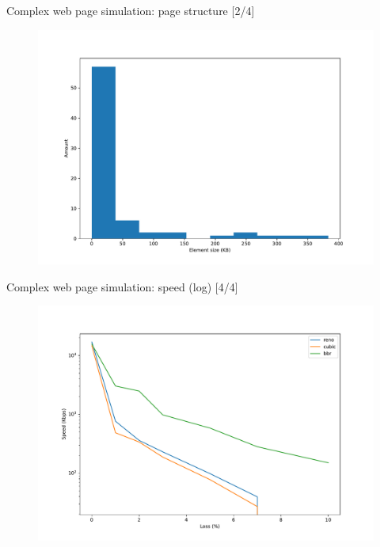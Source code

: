 \documentclass[13pt,aspectratio=43]{beamer}
\begin{document}
\begin{frame}{Complex web page simulation: page structure [2/4]}
  \begin{figure}
	  \includegraphics[width=\textwidth,height=\textheight,keepaspectratio]{../http_test/page_stat.pdf}
  \end{figure}

\end{frame}



\begin{frame}{Complex web page simulation: speed (log) [4/4]}
  \begin{figure}
	  \includegraphics[width=\textwidth,height=\textheight,keepaspectratio]{../http_test/plot_log.pdf}
  \end{figure}
\end{frame}
\end{document}
